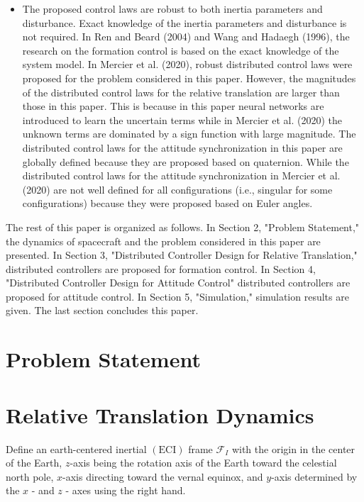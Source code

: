 \documentclass[10pt]{article}
\begin{document}
\begin{itemize}
  \item The proposed control laws are robust to both inertia parameters and disturbance. Exact knowledge of the inertia parameters and disturbance is not required. In Ren and Beard (2004) and Wang and Hadaegh (1996), the research on the formation control is based on the exact knowledge of the system model. In Mercier et al. (2020), robust distributed control laws were proposed for the problem considered in this paper. However, the magnitudes of the distributed control laws for the relative translation are larger than those in this paper. This is because in this paper neural networks are introduced to learn the uncertain terms while in Mercier et al. (2020) the unknown terms are dominated by a sign function with large magnitude. The distributed control laws for the attitude synchronization in this paper are globally defined because they are proposed based on quaternion. While the distributed control laws for the attitude synchronization in Mercier et al. (2020) are not well defined for all configurations (i.e., singular for some configurations) because they were proposed based on Euler angles.
\end{itemize}

The rest of this paper is organized as follows. In Section 2, "Problem Statement," the dynamics of spacecraft and the problem considered in this paper are presented. In Section 3, "Distributed Controller Design for Relative Translation," distributed controllers are proposed for formation control. In Section 4, "Distributed Controller Design for Attitude Control" distributed controllers are proposed for attitude control. In Section 5, "Simulation," simulation results are given. The last section concludes this paper.

\section{Problem Statement}
\section{Relative Translation Dynamics}
Define an earth-centered inertial $(\mathrm{ECI})$ frame $\mathcal{F}_{I}$ with the origin in the center of the Earth, $z$-axis being the rotation axis of the Earth toward the celestial north pole, $x$-axis directing toward the vernal equinox, and $y$-axis determined by the $x$ - and $z$ - axes using the right hand.
\end{document}
